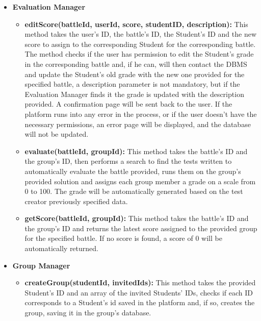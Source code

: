 \documentclass{article}
\begin{document}
{\begin{itemize}
\begin{itemize}
        the evaluated group's ID, then sends each group member a notification via e-mail, letting them know that a new score was assigned to them for their newly
        uploaded solution. This is achieved using external Notification APIs.
        \item \textbf{sendRegistrationNot(userId):} This method is called after a user's registration procedure is completed. Once the user's data is saved 
        in the user's database, an e-mail, containing a confirmation message for the registration procedure is sent to the user.
        This is achieved using external Notification APIs.  
    \end{itemize}
    \item \textbf{Evaluation Manager}
    \begin{itemize}
        \item \textbf{editScore(battleId, userId, score, studentID, description):} This method takes the user's ID, the battle's ID, the Student's ID and the new score to assign to the 
        corresponding Student for the corresponding battle. The method checks if the user has permission to edit the Student's grade in the corresponding battle and, 
        if he can, will then contact the DBMS and update the Student's old grade with the new one provided for the specified battle, a description parameter is not mandatory, 
        but if the Evaluation Manager finds it the grade is updated with the description provided. 
        A confirmation page will be sent back to the user.
        If the platform runs into any error in the process, or if the user doesn't have the necessary permissions, an error page will be displayed, and the database will not be
        updated.
        \item \textbf{evaluate(battleId, groupId):} This method takes the battle's ID and the group's ID, then performs a search to find the tests written to automatically
        evaluate the battle provided, runs them on the group's provided solution and assigns each group member a grade on a scale from 0 to 100.
        The grade will be automatically generated based on the test creator previously specified data.
        \item \textbf{getScore(battleId, groupId):}  This method takes the battle's ID and the group's ID and returns the latest score assigned to the provided group for the 
        specified battle. If no score is found, a score of 0 will be automatically returned.
    \end{itemize}
    \item \textbf{Group Manager}
    \begin{itemize}
        \item \textbf{createGroup(studentId, invitedIds):} This method takes the provided Student's ID and an array of the invited Students' IDs,
        checks if each ID corresponds to a Student's id saved in the platform and, if so, creates the group, saving it in the group's database.  
    \end{itemize}
\end{itemize}

}
\end{document}
